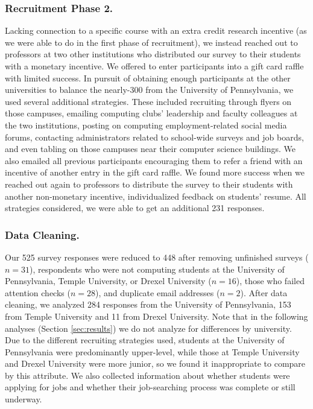 \subsubsection{Recruitment Phase 2. }Lacking connection to a specific course with an extra credit research incentive (as we were able to do in the first phase of recruitment), we instead reached out to professors at two other institutions who distributed our survey to their students with a monetary incentive. We offered to enter participants into a gift card raffle with limited success. In pursuit of obtaining enough participants at the other universities to balance the nearly-300 from the University of Pennsylvania, we used several additional strategies. These included recruiting through flyers on those campuses, emailing computing clubs' leadership and faculty colleagues at the two institutions, posting on computing employment-related social media forums, contacting administrators related to school-wide surveys and job boards, and even tabling on those campuses near their computer science buildings. We also emailed all previous participants encouraging them to refer a friend with an incentive of another entry in the gift card raffle. We found more success when we reached out again to professors to distribute the survey to their students with another non-monetary incentive, individualized feedback on students' resume. All strategies considered, we were able to get an additional 231 responses. 

\subsubsection{Data Cleaning. }Our 525 survey responses were reduced to 448 after removing unfinished surveys ($n=31$), respondents who were not computing students at the University of Pennsylvania, Temple University, or Drexel University ($n=16$), those who failed attention checks ($n=28$), and duplicate email addresses ($n=2$). After data cleaning, we analyzed 284 responses from the University of Pennsylvania, 153 from Temple University and 11 from Drexel University. Note that in the following analyses (Section \ref{sec:results}) we do not analyze for differences by university. Due to the different recruiting strategies used, students at the University of Pennsylvania were predominantly upper-level, while those at Temple University and Drexel University were more junior, so we found it inappropriate to compare by this attribute. We also collected information about whether students were applying for jobs and whether their job-searching process was complete or still underway.

